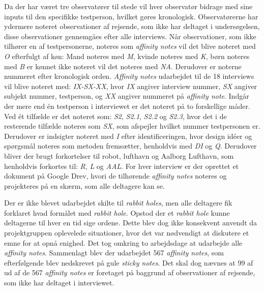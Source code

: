 Da der har været tre observatører til stede vil hver observatør bidrage med sine inputs til den specifikke testperson, hvilket gøres kronologisk. Observatørerne har ydermere noteret observationer af rejsende, som ikke har deltaget i undersøgelsen, disse observationer gennemgåes efter alle interviews. Når observationer, som ikke tilhører en af testpersonerne, noteres som \textit{affinity notes} vil det blive noteret med \textit{O} efterfulgt af køn: Mand noteres med \textit{M}, kvinde noteres med \textit{K}, børn noteres med \textit{B} er kønnet ikke noteret vil det noteres med \textit{NA}. Derudover er noterne nummeret efter kronologisk orden. \textit{Affinity notes} udarbejdet til de 18 interviews vil blive noteret med: \textit{IX-SX-XX}, hvor \textit{IX} angiver interview nummer, \textit{SX} angiver subjekt nummer, testperson, og \textit{XX} angiver nummeret på \textit{affinity note}. Indgår der mere end én testperson i interviewet er det noteret på to forskellige måder. Ved ét tilfælde er det noteret som: \textit{S2}, \textit{S2.1}, \textit{S2.2} og \textit{S2.3}, hvor det i de resterende tilfælde noteres som \textit{SX}, som afspejler hvilket nummer testpersonen er. Derudover er indsigter noteret med \textit{I} efter identificeringen, hvor design idéer og spørgsmål noteres som metoden fremsætter, henholdvis med \textit{DI} og \textit{Q}. Derudover bliver der brugt forkortelser til robot, lufthavn og Aalborg Lufthavn, som henholdvis forkortes til: \textit{R}, \textit{L} og \textit{AAL}. For hver interview er der oprettet et dokument på Google Drev, hvori de tilhørende \textit{affinity notes} noteres og projekteres på en skærm, som alle deltagere kan se. 

Der er ikke blevet udarbejdet skilte til \textit{rabbit holes}, men alle deltagere fik forklaret hvad formålet med \textit{rabbit hole}. Opstod der et \textit{rabbit hole} kunne deltagerne til hver en tid sige ordene. Dette blev dog ikke konsekvent anvendt da projektgruppen oplevelede situationer, hvor det var nødvendigt at diskutere et emne for at opnå enighed. Det tog omkring to arbejdsdage at udarbejde alle \textit{affinity notes}. Sammenlagt blev der udarbejdet 567 \textit{affinity notes}, som efterfølgende blev nedskrevet på gule \textit{sticky notes}. Det skal dog nævnes at 99 af ud af de 567 \textit{affinity notes} er foretaget på baggrund af observationer af rejsende, som ikke har deltaget i interviewet.    


